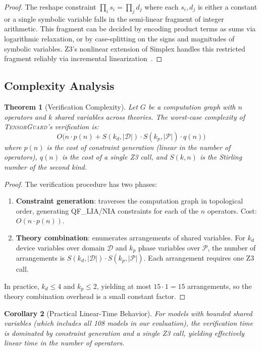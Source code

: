\documentclass[10pt]{article}
\newcommand{\tguard}{\textsc{TensorGuard}}
\theoremstyle{plain}
\newtheorem{theorem}{Theorem}[section]
\newtheorem{corollary}[theorem]{Corollary}
\theoremstyle{definition}
\theoremstyle{remark}
\begin{document}
\begin{proof}
The reshape constraint $\prod_i s_i = \prod_j d_j$ where each
$s_i, d_j$ is either a constant or a single symbolic variable
falls in the semi-linear fragment of integer arithmetic.  This
fragment can be decided by encoding product terms as sums via
logarithmic relaxation, or by case-splitting on the signs and
magnitudes of symbolic variables.  Z3's nonlinear extension of
Simplex handles this restricted fragment reliably via incremental
linearization~\cite{leino10}.
\end{proof}

\subsection{Complexity Analysis}

\begin{theorem}[Verification Complexity]\label{thm:complexity}
Let $G$ be a computation graph with $n$ operators and $k$ shared
variables across theories.  The worst-case complexity of
\tguard{}'s verification is:
\[
  O\Big(n \cdot p(n) + S(k_d, |\mathcal{D}|) \cdot S(k_p, |\mathcal{P}|) \cdot q(n)\Big)
\]
where $p(n)$ is the cost of constraint generation (linear in the
number of operators), $q(n)$ is the cost of a single Z3 call, and
$S(k, n)$ is the Stirling number of the second kind.
\end{theorem}

\begin{proof}
The verification procedure has two phases:
\begin{enumerate}[nosep]
  \item \textbf{Constraint generation}: traverses the computation
    graph in topological order, generating QF\_LIA/NIA constraints
    for each of the $n$ operators.  Cost: $O(n \cdot p(n))$.
  \item \textbf{Theory combination}: enumerates arrangements of
    shared variables.  For $k_d$ device variables over domain
    $\mathcal{D}$ and $k_p$ phase variables over $\mathcal{P}$,
    the number of arrangements is
    $S(k_d, |\mathcal{D}|) \cdot S(k_p, |\mathcal{P}|)$.  Each
    arrangement requires one Z3 call.
\end{enumerate}
In practice, $k_d \leq 4$ and $k_p \leq 2$, yielding at most
$15 \cdot 1 = 15$ arrangements, so the theory combination overhead
is a small constant factor.
\end{proof}

\begin{corollary}[Practical Linear-Time Behavior]
For models with bounded shared variables (which includes all 108
models in our evaluation), the verification time is dominated by
constraint generation and a single Z3 call, yielding effectively
linear time in the number of operators.
\end{corollary}
\end{document}

